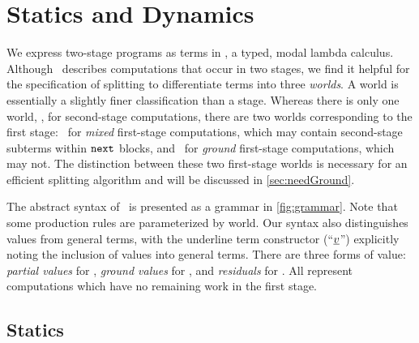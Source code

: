 
\section{\texorpdfstring{\lang}{λ12} Statics and Dynamics}
\label{sec:semantics}



We express two-stage programs as terms in \lang, a typed, modal lambda calculus. 
Although \lang\ describes computations that occur in two stages,
we find it helpful for the specification of splitting to differentiate terms into three \emph{worlds}.
A world is essentially a slightly finer classification than a stage.
Whereas there is only one world, \bbtwo, for second-stage computations,
there are two worlds corresponding to the first stage:
\bbonem\ for \emph{mixed} first-stage computations, which may contain second-stage subterms within ${\tt next}$ blocks,
and \bbonep\ for \emph{ground} first-stage computations, which may not.
The distinction between these two first-stage worlds is necessary for an efficient splitting algorithm
and will be discussed in \ref{sec:needGround}.

The abstract syntax of \lang\ is presented as a grammar in \ref{fig:grammar}.  
Note that some production rules are parameterized by world.
Our syntax also distinguishes values from general terms, 
with the underline term constructor (``$\underline{v}$'') explicitly noting the inclusion of values into general terms.
There are three forms of value: \emph{partial values} for \bbonem, \emph{ground values} for \bbonep, and \emph{residuals} for \bbtwo.
All represent computations which have no remaining work in the first stage.

\subsection{Statics}
\label{sec:statics}



